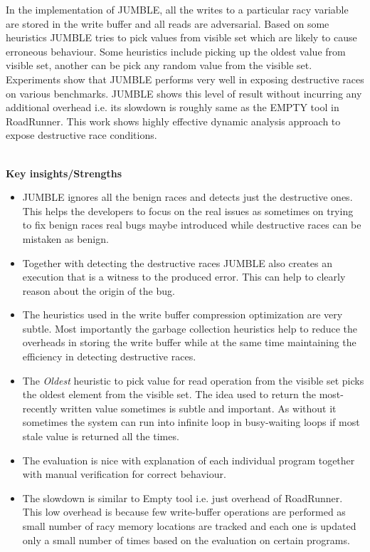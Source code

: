 \documentclass[20pt]{letter}
\begin{document}
\begin{enumerate}
{In the implementation of JUMBLE, all the writes to a particular racy variable are stored in the write buffer and all reads are adversarial. Based on some heuristics JUMBLE tries to pick values from visible set which are likely to cause erroneous behaviour. Some heuristics include picking up the oldest value from visible set, another can be pick any random value from the visible set. Experiments show that JUMBLE performs very well in exposing destructive races on various benchmarks. JUMBLE shows this level of result without incurring any additional overhead i.e. its slowdown is roughly same as the EMPTY tool in RoadRunner. This work shows highly effective dynamic analysis approach to expose destructive race conditions.

\pagebreak

\textbf{\\Key insights/Strengths}\\
\begin{itemize}
    \item JUMBLE ignores all the benign races and detects just the destructive ones. This helps the developers to focus on the real issues as sometimes on trying to fix benign races real bugs maybe introduced while destructive races can be mistaken as benign.
    \item Together with detecting the destructive races JUMBLE also creates an execution that is a witness to the produced error. This can help to clearly reason about the origin of the bug.
    \item The heuristics used in the write buffer compression optimization are very subtle. Most importantly the garbage collection heuristics help to reduce the overheads in storing the write buffer while at the same time maintaining the efficiency in detecting destructive races.
    \item The \textit{Oldest} heuristic to pick value for read operation from the visible set picks the oldest element from the visible set. The idea used to return the most-recently written value sometimes is subtle and important. As without it sometimes the system can run into infinite loop in busy-waiting loops if most stale value is returned all the times. 
    \item The evaluation is nice with explanation of each individual program together with manual verification for correct behaviour.
    \item The slowdown is similar to Empty tool i.e. just overhead of RoadRunner. This low overhead is because few write-buffer operations are performed as small number of racy memory locations are tracked and each one is updated only a small number of times based on the evaluation on certain programs. 
\end{itemize}

}
\end{enumerate}
\end{document}
